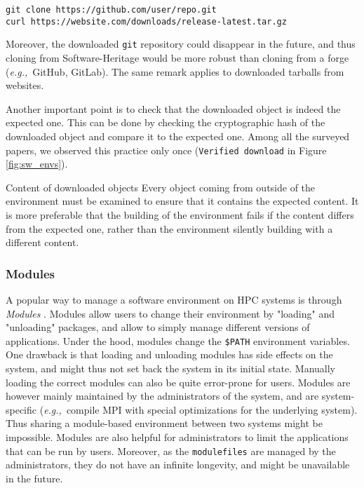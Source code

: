 \documentclass[sigconf,natbib=false]{acmart}
\newcommand{\eg}{\emph{e.g.,}}
\newcommand{\todo}[1]{{\color{red}{TODO: #1}}}
\begin{document}
\begin{verbatim}
git clone https://github.com/user/repo.git
curl https://website.com/downloads/release-latest.tar.gz
\end{verbatim}

Moreover, the downloaded \texttt{git} repository could disappear in the future, and thus cloning from Software-Heritage would be more robust than cloning from a forge (\eg\ GitHub, GitLab).
The same remark applies to downloaded tarballs from websites.

Another important point is to check that the downloaded object is indeed the expected one.
This can be done by checking the cryptographic hash of the downloaded object and compare it to the expected one.
Among all the surveyed papers, we observed this practice only once (\texttt{Verified download} in Figure \ref{fig:sw_envs}).

\begin{lesson}{Content of downloaded objects}{}
Every object coming from outside of the environment must be examined to ensure that it contains the expected content.
It is more preferable that the building of the environment fails if the content differs from the expected one, rather than the environment silently building with a different content.
\end{lesson}

\subsubsection{Modules}

A popular way to manage a software environment on HPC systems is through \emph{Modules} \cite{modules}.
Modules allow users to change their environment by "loading" and "unloading" packages, and allow to simply manage different versions of applications. 
Under the hood, modules change the \texttt{\$PATH} environment variables.
One drawback is that loading and unloading modules has side effects on the system, and might thus not set back the system in its initial state.
Manually loading the correct modules can also be quite error-prone for users.
Modules are however mainly maintained by the administrators of the system, and are system-specific (\eg\ compile MPI with special optimizations for the underlying system).
Thus sharing a module-based environment between two systems might be impossible.
Modules are also helpful for administrators to limit the applications that can be run by users.
Moreover, as the \texttt{modulefiles} are managed by the administrators, they do not have an infinite longevity, and might be unavailable in the future.
\end{document}

